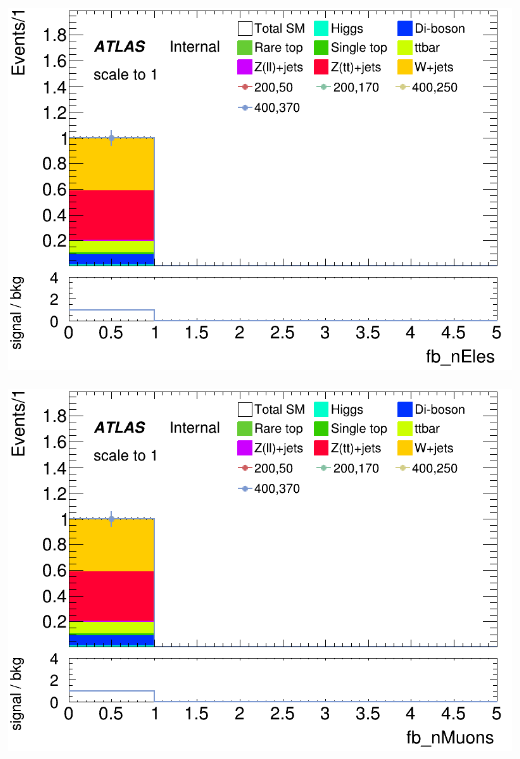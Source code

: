 \documentclass[usenames,dvipsnames]{beamer}
\begin{document}
\begin{frame}
    \begin{minipage}{0.32\textwidth}
        \centering
        \includegraphics[width=\textwidth]{graphics/HH_met_sig/HH_fb_nEles_norm.png}
    \end{minipage}
    \hfill
    \begin{minipage}{0.32\textwidth}
        \centering
        \includegraphics[width=\textwidth]{graphics/HH_met_sig/HH_fb_nMuons_norm.png}
    \end{minipage}
    \hfill
    \begin{minipage}{0.32\textwidth}
        \centering

\end{minipage}
\end{frame}
\end{document}
